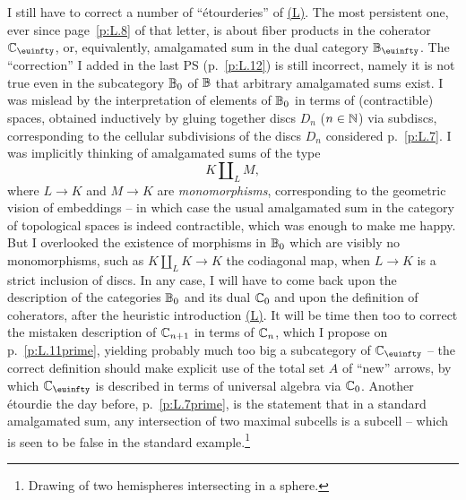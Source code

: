 \bigbreak

\presectionfill{}\par

\label{sec:18}%
I still have to correct a number of ``\'etourderies'' of
\hyperref[ch:I]{(L)}. The most persistent one, ever since page~\ref{p:L.8} of
that letter, is about fiber products in the coherator $\bC_\oo$, or,
equivalently, amalgamated sum in the dual category $\bB_\oo$. The
``correction'' I added in the last PS (p.~\ref{p:L.12}) is
still incorrect, namely it is not true even in the subcategory ${\mathbb{B}}_0$
of ${\mathbb{B}}$ that arbitrary amalgamated sums exist. I was mislead by the
interpretation of elements of ${\mathbb{B}}_0$ in terms of (contractible)
spaces, obtained inductively by gluing together discs $D_n$
($n\in{\ensuremath{\mathbb{N}}}$) via subdiscs, corresponding to the cellular subdivisions
of the discs $D_n$ considered p.~\ref{p:L.7}. I was implicitly
thinking of amalgamated sums of the type
\[ K \amalg_L M,\]
where $L\to K$ and $M\to K$ are \emph{monomorphisms}, corresponding to
the geometric vision of embeddings -- in which case the usual
amalgamated sum in the category of topological spaces is indeed
contractible, which was enough to make me happy. But I overlooked the
existence of morphisms in ${\mathbb{B}}_0$ which are visibly no
monomorphisms, such as $K \amalg_L K \to K$ the codiagonal map, when
$L \to K$ is a strict inclusion of discs. In any case, I will have to
come back upon the description of the categories ${\mathbb{B}}_0$ and its
dual ${\mathbb{C}}_0$ and upon the definition of coherators, after the
heuristic introduction \hyperref[ch:I]{(L)}. It will be time then too to correct the
mistaken description of ${\mathbb{C}}_{n+1}$ in terms of ${\mathbb{C}}_n$, which I
propose on p.~\ref{p:L.11prime}, yielding probably much too big a subcategory of
$\bC_\oo$ -- the correct definition should make explicit use of the
total set $A$ of ``new'' arrows, by which $\bC_\oo$ is described in
terms of universal algebra via ${\mathbb{C}}_0$. Another \'etourdie the day
before, p.~\ref{p:L.7prime}, is the statement that in a standard amalgamated sum,
any intersection of two maximal subcells is a subcell -- which is seen
to be false in the standard example.\footnote{Drawing of two
  hemispheres intersecting in a sphere.}

